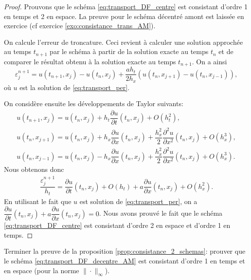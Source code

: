 \documentclass[12pt,a4paper,twoside]{article}
\begin{document}
\begin{proof}
  Prouvons que le sch\'ema \eqref{eq:transport_DF_centre} est consistant
  d'ordre 1 en temps et 2 en espace.
  La preuve pour le sch\'ema d\'ecentr\'e amont est laiss\'ee en exercice
  (cf exercice \ref{exo:consistance_trans_AM}).

  On calcule l'erreur de troncature. Ceci revient \`a 
  calculer une solution approch\'ee au temps $t_{n+1}$ par le sch\'ema \`a partir
  de la solution exacte au temps $t_n$ et de comparer le r\'esultat
  obtenu \`a la solution exacte au temps $t_{n+1}$.
  On a ainsi
  \[
    \varepsilon_j^{n+1} = u(t_{n+1},x_j) - u(t_n,x_j)
    + \dfrac{a h_t}{2 h_x} (u(t_n, x_{j+1}) - u(t_n, x_{j-1})) ,
  \]
  o\`u $u$ est la solution de \eqref{eq:transport_per}.

  On consid\`ere ensuite les d\'eveloppements de Taylor suivants:
  \begin{align*}
    u(t_{n+1} , x_j) = u(t_n , x_j) + h_t \dfrac{\partial u}{\partial t} (t_n , x_j)
    + O(h_t^2) ,
    \\
    u(t_n , x_{j+1} ) = u(t_n , x_{j} ) + h_x \dfrac{\partial u}{\partial x}(t_n, x_j)
    + \dfrac{h_x^2}{2} \dfrac{\partial^2 u}{\partial x^2}(t_n, x_j)
    + O(h_x^3) ,
    \\
    u(t_{n} , x_{j-1} ) = u(t_n , x_{j} ) - h_x \dfrac{\partial u}{\partial x}(t_n, x_j)
    + \dfrac{h_x^2}{2} \dfrac{\partial^2 u}{\partial x^2}(t_n, x_j)
    + O(h_x^3) .
  \end{align*}
  Nous obtenons donc
  \begin{align*}
    \dfrac{\varepsilon_j^{n+1}}{h_t} = \dfrac{\partial u}{\partial t}(t_n, x_j)
    + O (h_t) + a \dfrac{\partial u}{\partial x}(t_n, x_j) + O (h_x^2) .
  \end{align*}
  En utilisant le fait que $u$ est solution de \eqref{eq:transport_per},
  on a 
  $\dfrac{\partial u}{\partial t}(t_n, x_j) + a \dfrac{\partial u}{\partial x}(t_n, x_j) = 0$.
  Nous avons prouv\'e le fait que le sch\'ema \eqref{eq:transport_DF_centre}
  est consistant d'ordre 2 en espace et d'ordre 1 en temps.
\end{proof}

\begin{exercise}
  \label{exo:consistance_trans_AM}
  Terminer la preuve de la proposition \ref{prop:consistance_2_schemas}:
  prouver que le sch\'ema \eqref{eq:transport_DF_decentre_AM} est consistant
  d'ordre 1 en temps et en espace (pour la norme $\| \cdot \|_{\infty}$). 
\end{exercise}
\end{document}

